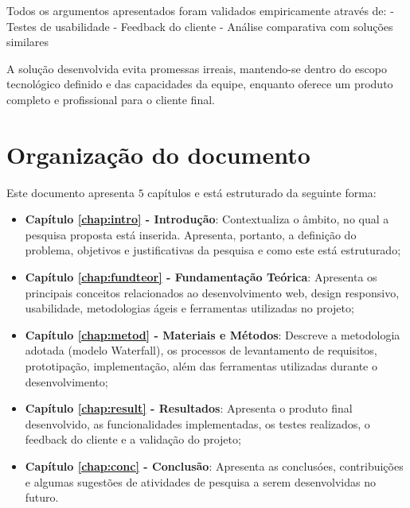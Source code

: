 Todos os argumentos apresentados foram validados empiricamente através de:
- Testes de usabilidade
- Feedback do cliente
- Análise comparativa com soluções similares

A solução desenvolvida evita promessas irreais, mantendo-se dentro do escopo tecnológico definido e das capacidades da equipe, enquanto oferece um produto completo e profissional para o cliente final.

\newpage


\section{Organização do documento}
\label{section:organizacao}

Este documento apresenta $5$ capítulos e está estruturado da seguinte forma:

\begin{itemize}

  \item \textbf{Capítulo \ref{chap:intro} - Introdução}: Contextualiza o âmbito, no qual a pesquisa proposta está inserida. Apresenta, portanto, a definição do problema, objetivos e justificativas da pesquisa e como este \thetypeworkthree está estruturado;
  \item \textbf{Capítulo \ref{chap:fundteor} - Fundamentação Teórica}:  Apresenta os principais conceitos relacionados ao desenvolvimento web, design responsivo, usabilidade, metodologias ágeis e ferramentas utilizadas no projeto;
  \item \textbf{Capítulo \ref{chap:metod} - Materiais e Métodos}: Descreve a metodologia adotada (modelo Waterfall), os processos de levantamento de requisitos, prototipação, implementação, além das ferramentas utilizadas durante o desenvolvimento;
  \item \textbf{Capítulo \ref{chap:result} - Resultados}: Apresenta o produto final desenvolvido, as funcionalidades implementadas, os testes realizados, o feedback do cliente e a validação do projeto;
  \item \textbf{Capítulo \ref{chap:conc} - Conclusão}: Apresenta as conclusóes, contribuições e algumas sugestões de atividades de pesquisa a serem desenvolvidas no futuro.

\end{itemize}
